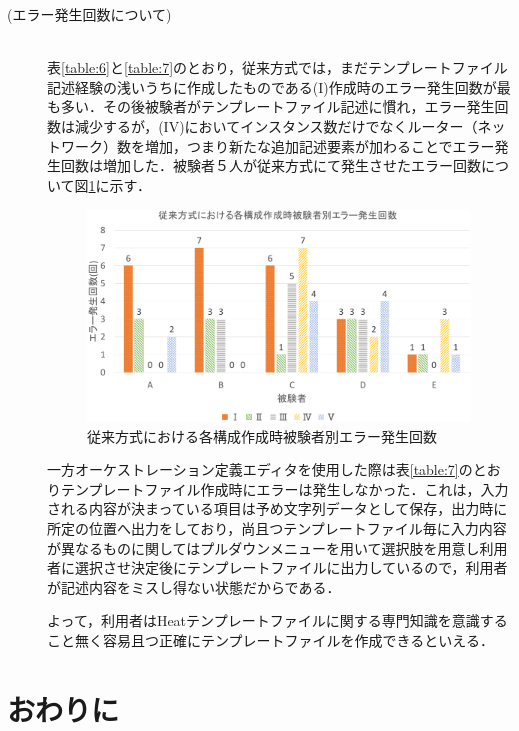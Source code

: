 \documentclass[mingoth]{kut-paper}		%
\begin{document}
\begin{description}
		\item[(エラー発生回数について)]\mbox{}\\
		表\ref{table:6}と\ref{table:7}のとおり，従来方式では，まだテンプレートファイル記述経験の浅いうちに作成したものである(I)作成時のエラー発生回数が最も多い．その後被験者がテンプレートファイル記述に慣れ，エラー発生回数は減少するが，(I\hspace{-1pt}V)においてインスタンス数だけでなくルーター（ネットワーク）数を増加，つまり新たな追加記述要素が加わることでエラー発生回数は増加した．被験者５人が従来方式にて発生させたエラー回数について図\ref{graf:6}に示す．
		\vspace{-2.8mm}
		\begin{figure}[H]
			\begin{center}
				\includegraphics[scale=0.45]{Document/TemplateFile_ErrorGraf.eps}
				\caption{従来方式における各構成作成時被験者別エラー発生回数}
				\label{graf:6}
			\end{center}
		\end{figure}
		一方オーケストレーション定義エディタを使用した際は表\ref{table:7}のとおりテンプレートファイル作成時にエラーは発生しなかった．これは，入力される内容が決まっている項目は予め文字列データとして保存，出力時に所定の位置へ出力をしており，尚且つテンプレートファイル毎に入力内容が異なるものに関してはプルダウンメニューを用いて選択肢を用意し利用者に選択させ決定後にテンプレートファイルに出力しているので，利用者が記述内容をミスし得ない状態だからである．
		
		よって，利用者はHeatテンプレートファイルに関する専門知識を意識すること無く容易且つ正確にテンプレートファイルを作成できるといえる．
	\end{description}
\chapter{おわりに}
\end{document}
